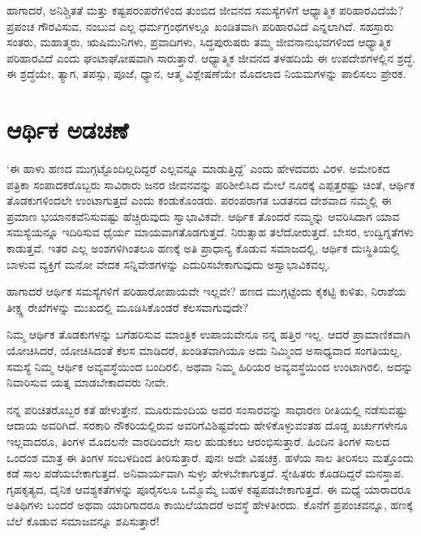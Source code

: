 ಹಾಗಾದರೆ, ಅನಿಶ್ಚಿತತೆ ಮತ್ತು ಕಷ್ಟಪರಂಪರೆಗಳಿಂದ ತುಂಬಿದ ಜೀವನದ ಸಮಸ್ಯೆಗಳಿಗೆ ಆಧ್ಯಾತ್ಮಿಕ ಪರಿಹಾರವಿದೆಯೆ? ಪ್ರಪಂಚ ಗೌರವಿಸುವ, ನಂಬುವ ಎಲ್ಲ ಧರ್ಮಗ್ರಂಥಗಳಲ್ಲೂ ಖಂಡಿತವಾಗಿ ಪರಿಹಾರವಿದೆ ಎನ್ನಲಾಗಿದೆ. ಸಹಸ್ರಾರು ಸಂತರು, ಮಹಾತ್ಮರು, ಋಷಿಮುನಿಗಳು, ಪ್ರವಾದಿಗಳು, ಸಿದ್ಧಪುರುಷರು ತಮ್ಮ ಜೀವನಾನುಭವಗಳಿಂದ ಆಧ್ಯಾತ್ಮಿಕ ಪರಿಹಾರವಿದೆ ಎಂದು ಘಂಟಾಘೋಷವಾಗಿ ಸಾರುತ್ತಾರೆ. ಆಧ್ಯಾತ್ಮಿಕ ಜೀವನದ ತಳಹದಿಯೆ ಈ ಉಪದೇಶಗಳಲ್ಲಿನ ಶ್ರದ್ಧೆ. ಈ ಶ್ರದ್ಧೆಯೇ, ತ್ಯಾಗ, ತಪಸ್ಸು, ಪೂಜೆ, ಧ್ಯಾನ, ಆತ್ಮ ವಿಶ್ಲೇಷಣೆಯೇ ಮೊದಲಾದ ನಿಯಮಗಳನ್ನು ಪಾಲಿಸಲು ಪ್ರೇರಕ.


\section*{ಆರ್ಥಿಕ ಅಡಚಣೆ}


‘ಈ ಹಾಳು ಹಣದ ಮುಗ್ಗಟ್ಟೊಂದಿಲ್ಲದಿದ್ದರೆ ಎಲ್ಲವನ್ನೂ ಮಾಡುತ್ತಿದ್ದೆ’ ಎಂದು ಹೇಳದವರು ವಿರಳ. ಅಮೇರಿಕದ ಪತ್ರಿಕಾ ಸಂಪಾದಕರೊಬ್ಬರು ಸಾವಿರಾರು ಜನರ ಜೀವನವನ್ನು ಪರಿಶೀಲಿಸಿದ ಮೇಲೆ ನೂರಕ್ಕೆ ಎಪ್ಪತ್ತರಷ್ಟು ಚಿಂತೆ, ಆರ್ಥಿಕ ತೊಡಕುಗಳಿಂದಲೇ ಉಂಟಾಗುತ್ತದೆ ಎಂದು ಕಂಡುಕೊಂಡರು. ಪರಂಪರಾಗತ ಬಡತನದ ದೇಶವಾದ ನಮ್ಮಲ್ಲಿ ಈ ಪ್ರಮಾಣ ಭಯಾನಕ\-ವೆನಿಸು\-ವಷ್ಟು ಹೆಚ್ಚಿರುವುದು ಸ್ವಾಭಾವಿಕವೇ. ಆರ್ಥಿಕ ತೊಂದರೆ ನಮ್ಮನ್ನು ಆವರಿಸಿದಾಗ ಯಾವ ಸಮಸ್ಯೆಯನ್ನೂ ಇದಿರಿಸುವ ಧೈರ್ಯ ಮಾಯವಾಗತೊಡಗುತ್ತದೆ. ನಿರುತ್ಸಾಹ ತಲೆದೋರುತ್ತದೆ. ಬೇಸರ, ಉದ್ವಿಗ್ನತೆಗಳು ಕಾಡುತ್ತವೆ. ಇತರ ಎಲ್ಲ ಅಂಶಗಳಿಗಿಂತಲೂ ಹಣಕ್ಕೆ ಅತಿ ಪ್ರಾಧಾನ್ಯ ಕೊಡುವ ಸಮಾಜದಲ್ಲಿ, ಆರ್ಥಿಕ ದುಃಸ್ಥಿತಿಯಲ್ಲಿ ಬಾಳುವ ವ್ಯಕ್ತಿಗೆ ಮನೋ ವೇದಕ ಸನ್ನಿವೇಶಗಳನ್ನು ಎದುರಿಸಬೇಕಾಗುವುದು ಅಸ್ವಾಭಾವಿಕವಲ್ಲ.

ಹಾಗಾದರೆ ಆರ್ಥಿಕ ಸಮಸ್ಯೆಗಳಿಗೆ ಪರಿಹಾರೋಪಾಯವೇ ಇಲ್ಲವೇ? ಹಣದ ಮುಗ್ಗಟ್ಟೆಂದು ಕೈಕಟ್ಟಿ ಕುಳಿತು, ನಿರಾಶೆಯ ತೀಕ್ಷ್ಣ ರೇಖೆಗಳನ್ನು ಮುಖದಲ್ಲಿ ಮೂಡಿಸಿಕೊಂಡರೆ ಕೆಲಸ\-ವಾಗು\-ವುದೇ?

ನಿಮ್ಮ ಆರ್ಥಿಕ ತೊಡಕುಗಳನ್ನು ಬಗೆಹರಿಸುವ ಮಾಂತ್ರಿಕ ಉಪಾಯವೇನೂ ನನ್ನ ಹತ್ತಿರ ಇಲ್ಲ. ಆದರೆ ಪ್ರಾಮಾಣಿಕವಾಗಿ ಯೋಚಿಸಿದರೆ, ಯೋಚಿಸಿದಂತೆ ಕೆಲಸ ಮಾಡಿದರೆ, ಖಂಡಿತವಾಗಿಯೂ ಅದು ನಿಮ್ಮಿಂದ ಅಸಾಧ್ಯವಾದ ಸಂಗತಿಯಲ್ಲ. ಸಮಸ್ಯೆ ನಿಮ್ಮ ಆರ್ಥಿಕ ಅವ್ಯವಸ್ಥೆಯಿಂದ ಬಂದಿರಲಿ, ಅಥವಾ ನಿಮ್ಮ ಹಿರಿಯರ ಅವ್ಯವಸ್ಥೆಯಿಂದ ಉಂಟಾಗಿರಲಿ, ಅದನ್ನು ನಿವಾರಿಸುವ ಯತ್ನ ಮಾಡಬೇಕಾದವರು ನೀವೇ.

ನನ್ನ ಪರಿಚಿತರೊಬ್ಬರ ಕತೆ ಹೇಳುತ್ತೇನೆ. ಮೂರುಮಂದಿಯ ಅವರ ಸಂಸಾರವನ್ನು ಸಾಧಾರಣ ರೀತಿಯಲ್ಲಿ ನಡೆಸುವಷ್ಟು ಆದಾಯ ಅವರಿಗಿದೆ. ಸರಕಾರಿ ನೌಕರಿಯಲ್ಲಿರುವ ಅವರಿಗೆ\break ವಿಶಿಷ್ಟವೆಂದು ಹೇಳಿಕೊಳ್ಳುವಂತಹ ದೊಡ್ಡ ಖರ್ಚುಗಳೇನೂ ಇಲ್ಲವಾದರೂ, ತಿಂಗಳ ಮೊದಲನೇ ವಾರದಿಂದಲೇ ಸಾಲ ಹುಡುಕಲು ಆರಂಭಿಸುತ್ತಾರೆ. ಹಿಂದಿನ ತಿಂಗಳ ಸಾಲದ ಒಂದಂಶ ಮಾತ್ರ ಈ ತಿಂಗಳ ಸಂಬಳದಿಂದ ತೀರಿಸುತ್ತಾರೆ. ಪುನಃ ಅದೇ ವಿಷಚಕ್ರ. ಹಳೆಯ ಸಾಲ ತೀರಿಸಲು ಮತ್ತೊಂದು ಕಡೆ ಸಾಲ ಪಡೆಯಬೇಕಾಗುತ್ತದೆ. ಅನಿವಾರ್ಯವಾಗಿ ಸುಳ್ಳು ಹೇಳಬೇಕಾಗುತ್ತದೆ. ಸ್ನೇಹಿತರು ಕೊಡದಿದ್ದರೆ ಮನಸ್ತಾಪ. ಗೃಹಕೃತ್ಯದ, ದೈನಿಕ ಆವಶ್ಯಕತೆಗಳನ್ನು ಪೂರೈಸಲೂ ಒಮ್ಮೊಮ್ಮೆ ಬಹಳ ಕಷ್ಟಪಡಬೇಕಾಗುತ್ತದೆ. ಈ ಮಧ್ಯೆ ಯಾರಾದರೂ ಅತಿಥಿಗಳು ಬಂದರೆ ಅಥವಾ ಯಾರಿಗಾದರೂ ಕಾಯಿಲೆಯಾದರೆ ಅವಸ್ಥೆ ಹೇಳತೀರದು. ಕೊನೆಗೆ ಪ್ರಪಂಚವನ್ನೂ, ಹಣಕ್ಕೆ ಬೆಲೆ ಕೊಡುವ ಸಮಾಜವನ್ನೂ ಶಪಿಸುತ್ತಾರೆ!

